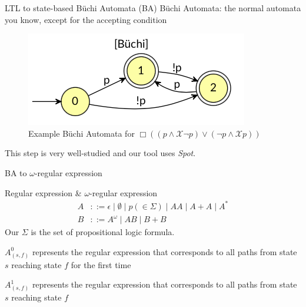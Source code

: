 \documentclass[handout]{beamer}
\newcommand{\alwaysf}{\Box}
\newcommand{\nexttf}{\mathcal{X}}
\newcommand{\Buchi}{B\"{u}chi }
\begin{document}
\begin{frame}{LTL to state-based \Buchi Automata (BA)}
    \Buchi Automata: the normal automata you know, except for the accepting condition
    
    \begin{figure}
        \centering
        \includegraphics[scale=0.5]{img/buchi-ex.png}
        \caption{Example \Buchi Automata for $\alwaysf ((p \wedge \nexttf \neg p) \vee (\neg p \wedge \nexttf p))$}
    \end{figure}

    This step is very well-studied \cite{Dur22} and our tool uses \textit{Spot}.
\end{frame}

\begin{frame}{BA to $\omega$-regular expression}
    \begin{definition}{Regular expression \& $\omega$-regular expression}
        \begin{align*}
            A & ::= \epsilon \mid \emptyset \mid p (\in \Sigma) \mid AA \mid A + A \mid A^* \\
            B & ::= A^{\omega} \mid AB \mid B + B
        \end{align*}
        Our $\Sigma$ is the set of propositional logic formula.
    \end{definition}

    \begin{definition}
        $A_{(s, f)}^0$ represents the regular expression that corresponds to all paths from state $s$ reaching state $f$ for the first time

        $A_{(s, f)}^1$ represents the regular expression that corresponds to all paths from state $s$ reaching state $f$
    \end{definition}
\end{frame}
\end{document}
